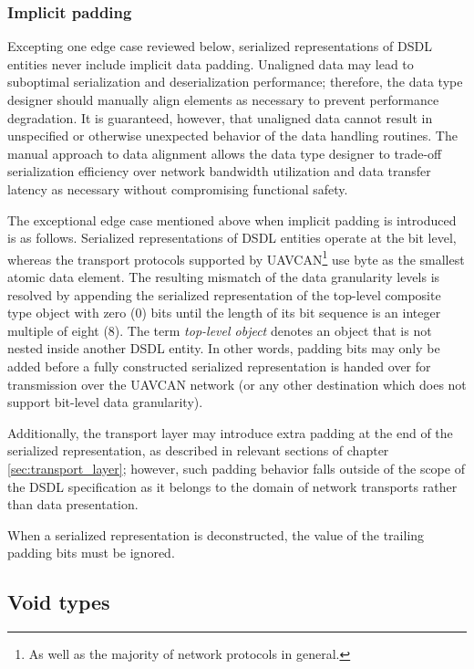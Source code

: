\subsubsection{Implicit padding}

Excepting one edge case reviewed below,
serialized representations of DSDL entities never include implicit data padding.
Unaligned data may lead to suboptimal serialization and deserialization performance;
therefore, the data type designer should manually align elements as necessary to prevent performance degradation.
It is guaranteed, however, that unaligned data cannot result in unspecified or otherwise unexpected behavior
of the data handling routines.
The manual approach to data alignment allows the data type designer to trade-off serialization efficiency
over network bandwidth utilization and data transfer latency as necessary without compromising functional safety.

The exceptional edge case mentioned above when implicit padding is introduced is as follows.
Serialized representations of DSDL entities operate at the bit level,
whereas the transport protocols supported by UAVCAN\footnote{As well as the majority of network protocols in general.}
use byte as the smallest atomic data element.
The resulting mismatch of the data granularity levels is resolved by
appending the serialized representation of the top-level composite type object with zero (0) bits
until the length of its bit sequence is an integer multiple of eight (8).
The term \emph{top-level object} denotes an object that is not nested inside another DSDL entity.
In other words, padding bits may only be added before a fully constructed serialized representation is
handed over for transmission over the UAVCAN network
(or any other destination which does not support bit-level data granularity).

Additionally, the transport layer may introduce extra padding at the end of the serialized representation,
as described in relevant sections of chapter \ref{sec:transport_layer};
however, such padding behavior falls outside of the scope of the DSDL specification
as it belongs to the domain of network transports rather than data presentation.

When a serialized representation is deconstructed, the value of the trailing padding bits must be ignored.

\subsection{Void types}\label{sec:dsdl_serialized_void}

